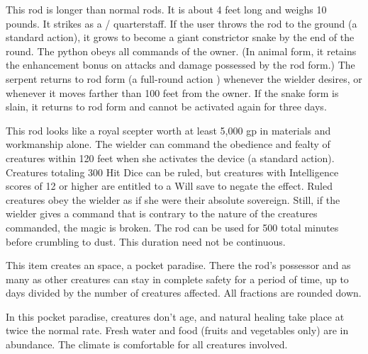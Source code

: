 
 This rod is longer than normal rods. It is about 4 feet long and weighs 10 pounds. It strikes as a / quarterstaff. If the user throws the rod to the ground (a standard action), it grows to become a giant constrictor snake by the end of the round. The python obeys all commands of the owner. (In animal form, it retains the  enhancement bonus on attacks and damage possessed by the rod form.) The serpent returns to rod form (a full-round action ) whenever the wielder desires, or whenever it moves farther than 100 feet from the owner. If the snake form is slain, it returns to rod form and cannot be activated again for three days.


 This rod looks like a royal scepter worth at least 5,000 gp in materials and workmanship alone. The wielder can command the obedience and fealty of creatures within 120 feet when she activates the device (a standard action). Creatures totaling 300 Hit Dice can be ruled, but creatures with Intelligence scores of 12 or higher are entitled to a Will save to negate the effect. Ruled creatures obey the wielder as if she were their absolute sovereign. Still, if the wielder gives a command that is contrary to the nature of the creatures commanded, the magic is broken. The rod can be used for 500 total minutes before crumbling to dust. This duration need not be continuous.


 This item creates an  space, a pocket paradise. There the rod's possessor and as many as  other creatures can stay in complete safety for a period of time, up to  days divided by the number of creatures affected. All fractions are rounded down.

In this pocket paradise, creatures don't age, and natural healing take place at twice the normal rate. Fresh water and food (fruits and vegetables only) are in abundance. The climate is comfortable for all creatures involved.

